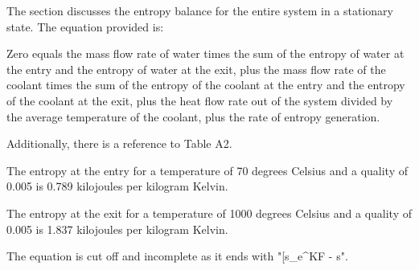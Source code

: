 The section discusses the entropy balance for the entire system in a stationary state. The equation provided is:

Zero equals the mass flow rate of water times the sum of the entropy of water at the entry and the entropy of water at the exit, plus the mass flow rate of the coolant times the sum of the entropy of the coolant at the entry and the entropy of the coolant at the exit, plus the heat flow rate out of the system divided by the average temperature of the coolant, plus the rate of entropy generation.

Additionally, there is a reference to Table A2.

The entropy at the entry for a temperature of 70 degrees Celsius and a quality of 0.005 is 0.789 kilojoules per kilogram Kelvin.

The entropy at the exit for a temperature of 1000 degrees Celsius and a quality of 0.005 is 1.837 kilojoules per kilogram Kelvin.

The equation is cut off and incomplete as it ends with "[s_e^{KF} - s".